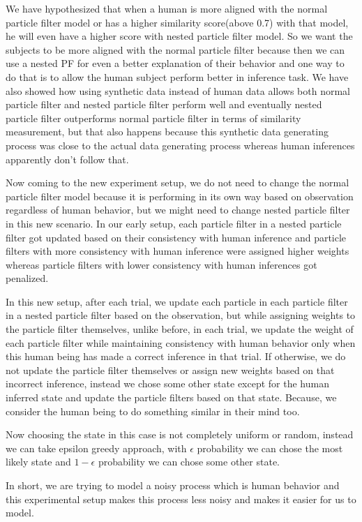 \documentclass[12pt,letterpaper]{article}
\begin{document}
We have hypothesized that when a human is more aligned with the normal particle filter model or has a higher similarity score(above 0.7) with that model, he will even have a higher score with nested particle filter model. So we want the subjects to be more aligned with the normal particle filter because then we can use a nested PF for even a better explanation of their behavior and one way to do that is to allow the human subject perform better in inference task. We have also showed how using synthetic data instead of human data allows both normal particle filter and nested particle filter perform well and eventually nested particle filter outperforms normal particle filter in terms of similarity measurement, but that also happens because this synthetic data generating process was close to the actual data generating process whereas human inferences apparently don’t follow that. 

Now coming to the new experiment setup, we do not need to change the normal particle filter model because it is performing in its own way based on observation regardless of human behavior, but we might need to change nested particle filter in this new scenario. In our early setup, each particle filter in a nested particle filter got updated based on their consistency with human inference and particle filters with more consistency with human inference were assigned higher weights whereas particle filters with lower consistency with human inferences got penalized. 

In this new setup, after each trial, we update each particle in each particle filter in a nested particle filter based on the observation, but while assigning weights to the particle filter themselves, unlike before, in each trial, we update the weight of each particle filter while maintaining consistency with human behavior only when this human being has made a correct inference in that trial. If otherwise, we do not update the particle filter themselves or assign new weights based on that incorrect inference, instead we chose some other state except for the human inferred state and update the particle filters based on that state.
Because, we consider the human being to do something similar in their mind too.
 
Now choosing the state in this case is not completely uniform or random, instead we can take epsilon greedy approach, with $\epsilon$ probability we can chose the most likely state and $1-\epsilon$ probability we can chose some other state. 

In short, we are trying to model a noisy process which is human behavior and this experimental setup makes this process less noisy and makes it easier for us to model.
\end{document}
